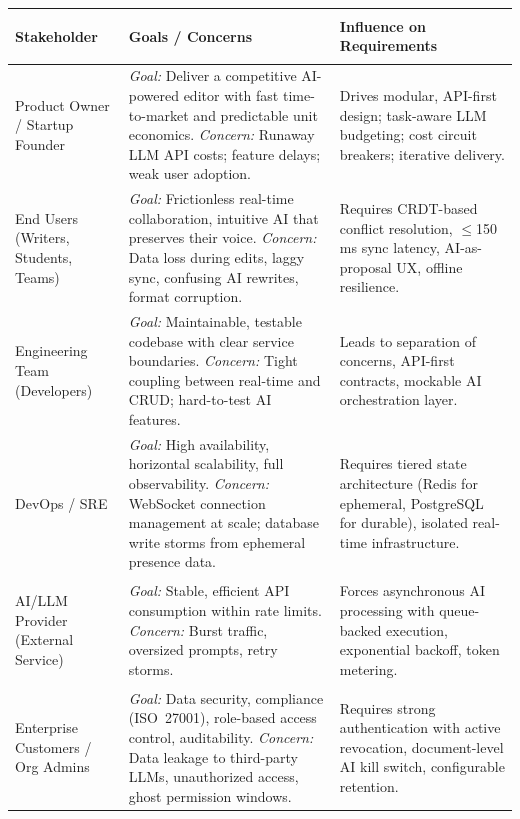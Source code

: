 \documentclass[10pt, a4paper]{article}
\begin{document}
{\small
\begin{tabularx}{\textwidth}{@{}>{\bfseries\raggedright}p{2.2cm}Xp{3.5cm}@{}}
\toprule
\textsf{Stakeholder} & \textsf{Goals / Concerns} & \textsf{Influence on Requirements} \\
\midrule
Product Owner / Startup Founder &
  \emph{Goal:} Deliver a competitive AI-powered editor with fast time-to-market and predictable unit economics.
  \emph{Concern:} Runaway LLM API costs; feature delays; weak user adoption.
  & Drives modular, API-first design; task-aware LLM budgeting; cost circuit breakers; iterative delivery. \\
\addlinespace[3pt]
End Users (Writers, Students, Teams) &
  \emph{Goal:} Frictionless real-time collaboration, intuitive AI that preserves their voice.
  \emph{Concern:} Data loss during edits, laggy sync, confusing AI rewrites, format corruption.
  & Requires CRDT-based conflict resolution, $\le$150\,ms sync latency, AI-as-proposal UX, offline resilience. \\
\addlinespace[3pt]
Engineering Team (Developers) &
  \emph{Goal:} Maintainable, testable codebase with clear service boundaries.
  \emph{Concern:} Tight coupling between real-time and CRUD; hard-to-test AI features.
  & Leads to separation of concerns, API-first contracts, mockable AI orchestration layer. \\
\addlinespace[3pt]
DevOps / SRE &
  \emph{Goal:} High availability, horizontal scalability, full observability.
  \emph{Concern:} WebSocket connection management at scale; database write storms from ephemeral presence data.
  & Requires tiered state architecture (Redis for ephemeral, PostgreSQL for durable), isolated real-time infrastructure. \\
\addlinespace[3pt]
AI/LLM Provider (External Service) &
  \emph{Goal:} Stable, efficient API consumption within rate limits.
  \emph{Concern:} Burst traffic, oversized prompts, retry storms.
  & Forces asynchronous AI processing with queue-backed execution, exponential backoff, token metering. \\
\addlinespace[3pt]
Enterprise Customers / Org Admins &
  \emph{Goal:} Data security, compliance (ISO~27001), role-based access control, auditability.
  \emph{Concern:} Data leakage to third-party LLMs, unauthorized access, ghost permission windows.
  & Requires strong authentication with active revocation, document-level AI kill switch, configurable retention. \\
\bottomrule
\end{tabularx}
}
\end{document}
